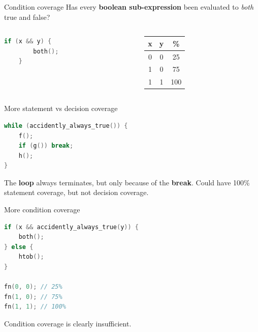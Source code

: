 \documentclass[xcolor = {dvipsnames, table}, aspectratio=169]{beamer}
\begin{document}
\begin{frame}[fragile]
    \begin{block}{Condition coverage}
        Has every \textbf{boolean sub-expression} been evaluated to
        \emph{both} true and false?
    \end{block}

    \begin{block}{}
        \begin{columns}
            \begin{column}{0.5\textwidth}
                \begin{lstlisting}[language = C]
    if (x && y) {
        both();
    }
                \end{lstlisting}
            \end{column}
            \begin{column}{0.5\textwidth}
                \begin{tabular}{c c c}
                    x & y & \%  \\
                    \hline
                    0 & 0 & 25  \\
                    1 & 0 & 75  \\
                    1 & 1 & 100 \\
                \end{tabular}
            \end{column}
        \end{columns}
    \end{block}
\end{frame}

\begin{frame}[fragile]
    \begin{block}{More statement vs decision coverage}
        \begin{lstlisting}[language = C]
while (accidently_always_true()) {
    f();
    if (g()) break;
    h();
}
        \end{lstlisting}
    \end{block}
\pause
The \textbf{loop} always terminates, but only because of the \textbf{break}.
Could have 100\% statement coverage, but not decision coverage.
\end{frame}

\begin{frame}[fragile]
    \begin{block}{More condition coverage}
        \begin{lstlisting}[language=C]
if (x && accidently_always_true(y)) {
    both();
} else {
    htob();
}

fn(0, 0); // 25%
fn(1, 0); // 75%
fn(1, 1); // 100%
        \end{lstlisting}
    \end{block}

    Condition coverage is clearly insufficient.
\end{frame}
\end{document}

